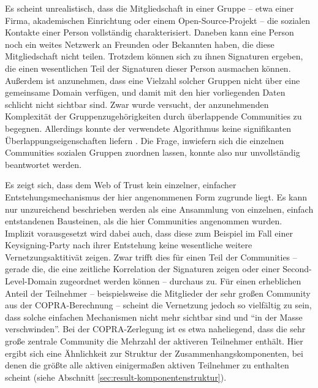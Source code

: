 Es scheint unrealistisch, dass die Mitgliedschaft in einer Gruppe --
etwa einer Firma, akademischen Einrichtung oder einem
Open-Source-Projekt -- die sozialen Kontakte einer Person
vollständig charakterisiert. Daneben kann eine Person noch ein
weites Netzwerk an Freunden oder Bekannten haben, die diese
Mitgliedschaft nicht teilen. Trotzdem können sich zu ihnen
Signaturen ergeben, die einen wesentlichen Teil der Signaturen dieser
Person ausmachen können. Außerdem ist anzunehmen, dass eine
Vielzahl solcher Gruppen nicht über eine gemeinsame Domain
verfügen, und damit mit den hier vorliegenden Daten schlicht nicht
sichtbar sind. Zwar wurde versucht, der anzunehmenden Komplexität
der Gruppenzugehörigkeiten durch überlappende Communities zu
begegnen. Allerdings konnte der verwendete Algorithmus keine
signifikanten Überlappungseigenschaften liefern . Die Frage,
inwiefern sich die einzelnen Communities sozialen Gruppen zuordnen
lassen, konnte also nur unvollständig beantwortet werden.

Es zeigt sich, dass dem Web of Trust kein einzelner, einfacher
Entstehungsmechanismus der hier angenommenen Form zugrunde liegt. Es
kann nur unzureichend beschrieben werden als eine Ansammlung von
einzelnen, einfach entstandenen Bausteinen, als die hier Communities
angenommen wurden. Implizit vorausgesetzt wird dabei auch, dass diese
zum Beispiel im Fall einer Keysigning-Party nach ihrer Entstehung
keine wesentliche weitere Vernetzungsaktitivät zeigen. Zwar trifft
dies für einen Teil der Communities -- gerade die, die eine
zeitliche Korrelation der Signaturen zeigen oder einer
Second-Level-Domain zugeordnet werden können -- durchaus zu. Für
einen erheblichen Anteil der Teilnehmer -- beispielsweise die
Mitglieder der sehr großen Community aus der COPRA-Berechnung --
scheint die Vernetzung jedoch so vielfältig zu sein, dass solche
einfachen Mechanismen nicht mehr sichtbar sind und ``in der Masse
verschwinden''. Bei der COPRA-Zerlegung ist es etwa naheliegend, dass
die sehr große zentrale Community die Mehrzahl der aktiveren
Teilnehmer enthält. Hier ergibt sich eine Ähnlichkeit zur Struktur
der Zusammenhangskomponenten, bei denen die größte alle aktiven
einigermaßen aktiven Teilnehmer zu enthalten scheint (siehe Abschnitt
\ref{sec:result-komponentenstruktur}).

